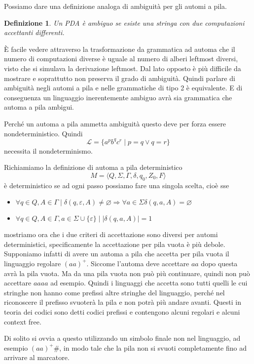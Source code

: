 \documentclass[12pt]{article}
\newtheorem{definizione}{Definizione}
\begin{document}
Possiamo dare una definizione analoga di ambiguità per gli automi a pila.
\begin{definizione}
	Un PDA è ambiguo se esiste una stringa con due computazioni accettanti differenti.
\end{definizione}
\`E facile vedere attraverso la trasformazione da grammatica ad automa che il numero di computazioni diverse è uguale al numero di alberi leftmost diversi, visto che si simulava la derivazione leftmost.
Dal lato opposto è più difficile da mostrare e soprattutto non preserva il grado di ambiguità.
Quindi parlare di ambiguità negli automi a pila e nelle grammatiche di tipo 2 è equivalente.
E di conseguenza un linguaggio inerentemente ambiguo avrà sia grammatica che automa a pila ambigui.

Perché un automa a pila ammetta ambiguità questo deve per forza essere nondeterministico.
Quindi
$$ \mathcal{L} = \{ a^p b^q c^r \mid p = q \vee q = r \} $$
necessita il nondeterminismo.

Richiamiamo la definizione di automa a pila deterministico
$$ M = \langle Q, \Sigma, \Gamma, \delta, q_0, Z_0, F \rangle $$
è deterministico se ad ogni passo possiamo fare una singola scelta, cioè sse
\begin{itemize}
	\item $\forall q \in Q, A \in \Gamma \mid \delta(q, \varepsilon, A) \neq \varnothing \Rightarrow \forall a \in \Sigma \delta(q, a, A) = \varnothing $
	\item $\forall q \in Q, A \in \Gamma, a \in \Sigma \cup \{ \varepsilon \} \mid | \delta(q, a, A) | = 1 $
\end{itemize}
mostriamo ora che i due criteri di accettazione sono diversi per automi deterministici, specificamente la accettazione per pila vuota è più debole.
Supponiamo infatti di avere un automa a pila che accetta per pila vuota il linguaggio regolare $(aa)^+$.
Siccome l'automa deve accettare $aa$ dopo questa avrà la pila vuota.
Ma da una pila vuota non può più continuare, quindi non può accettare $aaaa$ ad esempio.
Quindi i linguaggi che accetta sono tutti quelli le cui stringhe non hanno come prefissi altre stringhe del linguaggio, perché nel riconoscere il prefisso svuoterà la pila e non potrà più andare avanti.
Questi in teoria dei codici sono detti codici prefissi e contengono alcuni regolari e alcuni context free.

Di solito si ovvia a questo utilizzando un simbolo finale non nel linguaggio, ad esempio $(aa)^+ \#$, in modo tale che la pila non si svuoti completamente fino ad arrivare al marcatore.
\end{document}
